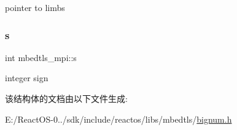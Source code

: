 pointer to limbs \mbox{\label{structmbedtls__mpi_a98e0b295f053643085b1c756857c3477}} 
\subsubsection{\texorpdfstring{s}{s}}
{\footnotesize\ttfamily int mbedtls\+\_\+mpi\+::s}

integer sign 

该结构体的文档由以下文件生成\+:\begin{DoxyCompactItemize}
\item 
E\+:/\+React\+O\+S-\/0../sdk/include/reactos/libs/mbedtls/\hyperlink{bignum_8h}{bignum.\+h}\end{DoxyCompactItemize}
